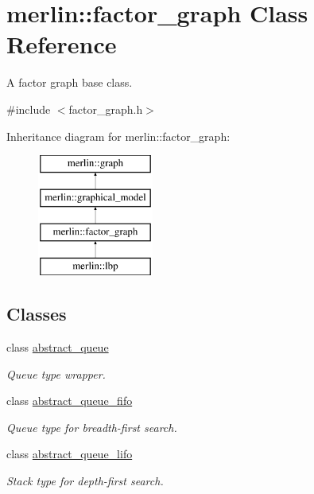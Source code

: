 \hypertarget{classmerlin_1_1factor__graph}{}\section{merlin\+:\+:factor\+\_\+graph Class Reference}
\label{classmerlin_1_1factor__graph}


A factor graph base class.  




{\ttfamily \#include $<$factor\+\_\+graph.\+h$>$}

Inheritance diagram for merlin\+:\+:factor\+\_\+graph\+:\begin{figure}[H]
\begin{center}
\leavevmode
\includegraphics[height=4.000000cm]{classmerlin_1_1factor__graph}
\end{center}
\end{figure}
\subsection*{Classes}
\begin{DoxyCompactItemize}
\item 
class \hyperlink{classmerlin_1_1factor__graph_1_1abstract__queue}{abstract\+\_\+queue}
\begin{DoxyCompactList}\small\item\em Queue type wrapper. \end{DoxyCompactList}\item 
class \hyperlink{classmerlin_1_1factor__graph_1_1abstract__queue__fifo}{abstract\+\_\+queue\+\_\+fifo}
\begin{DoxyCompactList}\small\item\em Queue type for breadth-\/first search. \end{DoxyCompactList}\item 
class \hyperlink{classmerlin_1_1factor__graph_1_1abstract__queue__lifo}{abstract\+\_\+queue\+\_\+lifo}
\begin{DoxyCompactList}\small\item\em Stack type for depth-\/first search. \end{DoxyCompactList}\end{DoxyCompactItemize}
